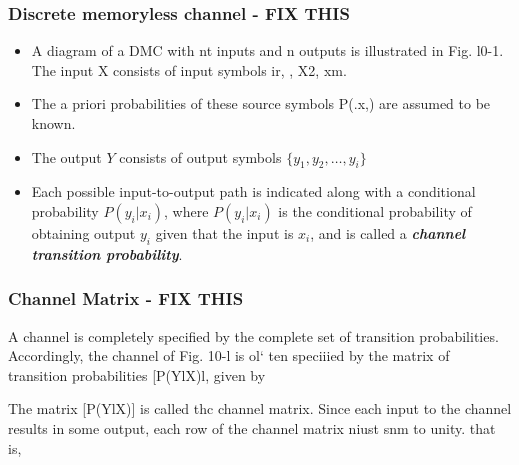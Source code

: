 \documentclass[a4]{beamer}
\begin{document}
\begin{frame}
\frametitle{Discrete memoryless channel - FIX THIS}
\begin{itemize}
	\item A diagram of a DMC with nt inputs and n outputs is illustrated in Fig. l0-1. The input X consists
	of input symbols ir, , X2,   xm. 
	\item The a priori probabilities of these source symbols P(.x,) are assumed to be known. 
	\item The output $Y$ consists of output symbols $\{y_1,y_2,\ldots, y_i \}$
	
	\item Each possible input-to-output path is indicated along with a conditional probability $P(y_i|x_i)$, where $P(y_i|x_i)$  is the conditional probability of
	obtaining output $y_i$ given that the input is $x_i$, and is called a \textbf{\emph{channel transition probability}}.
\end{itemize}

\end{frame}

\begin{frame}
\frametitle{Channel Matrix - FIX THIS}

A channel is completely specified by the complete set of transition probabilities. Accordingly, the
channel of Fig. 10-l is ol` ten speciiied by the matrix of transition probabilities [P(YlX)l, given by

The matrix [P(YlX)] is called thc channel matrix. Since each input to the channel results in some
output, each row of the channel matrix niust snm to unity. that is,
\end{frame}
\end{document}
